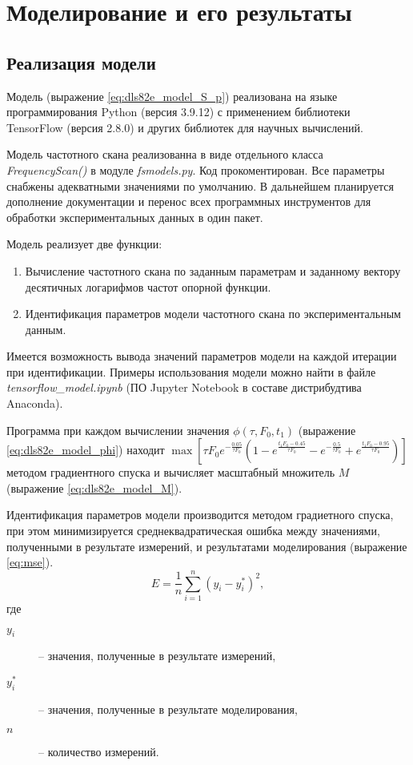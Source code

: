 \section{Моделирование и его результаты}
	

	\subsection{Реализация модели}
	Модель (выражение \ref{eq:dls82e_model_S_p}) реализована на 
	языке программирования Python (версия 3.9.12) с применением 
	библиотеки TensorFlow (версия 2.8.0) и других библиотек	для научных
	вычислений.

	Модель частотного скана реализованна в виде отдельного класса \\
	\emph{FrequencyScan()} в модуле \emph{fsmodels.py}. Код 
	прокоментирован. Все параметры снабжены адекватными значениями по 
	умолчанию. В дальнейшем планируется дополнение документации и 
	перенос всех программных инструментов для обработки 
	экспериментальных данных в один пакет.

	Модель реализует две функции:
	\begin{enumerate}
		\item Вычисление частотного скана по заданным параметрам и 
		заданному вектору десятичных логарифмов частот опорной функции.
		\item Идентификация параметров модели частотного скана по 
		экспериментальным данным.
	\end{enumerate}
	Имеется возможность вывода значений параметров модели на каждой 
	итерации при идентификации. Примеры использования модели можно найти
	в файле \emph{tensorflow\_model.ipynb} (ПО Jupyter Notebook в составе 
	дистрибудтива Anaconda).

	Программа при каждом вычислении значения $\phi\left(\tau,F_0,
	t_1\right)$	(выражение \ref{eq:dls82e_model_phi}) находит 
	\(
		\max{\left[
	    \tau F_0 e^{-\frac{0.05}{\tau F_0}}
	    \left(1-e^{\frac{t_1 F_0-0.45}{\tau F_0}}
	    -e^{-\frac{0.5}{\tau F_0}}+
	    e^{\frac{t_1 F_0-0.95}{\tau F_0}}\right)
	    \right]}
    \)
	методом	градиентного спуска и вычисляет масштабный множитель $M$ 
	(выражение \ref{eq:dls82e_model_M}).

	Идентификация параметров модели производится методом градиетного 
	спуска, при этом минимизируется среднеквадратическая ошибка между 
	значениями, полученными в результате измерений, и результатами 
	моделирования (выражение \ref{eq:mse}).
	\begin{equation}
		\label{eq:mse}
		E = \frac{1}{n}\sum_{i=1}^{n}\left(y_i - y_i^*\right)^2,
	\end{equation}
	где
	\begin{description}
		\item[$y_i$] -- значения, полученные в результате измерений,
		\item[$y_i^*$] -- значения, полученные в результате моделирования,
		\item[$n$] -- количество измерений.
	\end{description}

